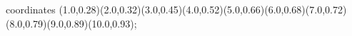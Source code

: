 					coordinates { (1.0,0.28)(2.0,0.32)(3.0,0.45)(4.0,0.52)(5.0,0.66)(6.0,0.68)(7.0,0.72)(8.0,0.79)(9.0,0.89)(10.0,0.93)};